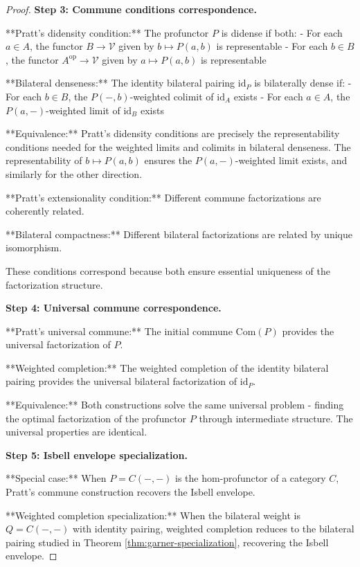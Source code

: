 \documentclass[11pt]{article}
\theoremstyle{plain}
\theoremstyle{definition}
\theoremstyle{remark}
\newcommand{\V}{\mathcal{V}}
\newcommand{\op}{\mathrm{op}}
\begin{document}
\begin{proof}
\textbf{Step 3: Commune conditions correspondence.}

**Pratt's didensity condition:** The profunctor $P$ is didense if both:
- For each $a \in A$, the functor $B \to \V$ given by $b \mapsto P(a, b)$ is representable
- For each $b \in B$, the functor $A^{\op} \to \V$ given by $a \mapsto P(a, b)$ is representable

**Bilateral denseness:** The identity bilateral pairing $\text{id}_P$ is bilaterally dense if:
- For each $b \in B$, the $P(-, b)$-weighted colimit of $\text{id}_A$ exists
- For each $a \in A$, the $P(a, -)$-weighted limit of $\text{id}_B$ exists

**Equivalence:** Pratt's didensity conditions are precisely the representability conditions needed for the weighted limits and colimits in bilateral denseness. The representability of $b \mapsto P(a, b)$ ensures the $P(a, -)$-weighted limit exists, and similarly for the other direction.

**Pratt's extensionality condition:** Different commune factorizations are coherently related.

**Bilateral compactness:** Different bilateral factorizations are related by unique isomorphism.

These conditions correspond because both ensure essential uniqueness of the factorization structure.

\textbf{Step 4: Universal commune correspondence.}

**Pratt's universal commune:** The initial commune $\text{Com}(P)$ provides the universal factorization of $P$.

**Weighted completion:** The weighted completion of the identity bilateral pairing provides the universal bilateral factorization of $\text{id}_P$.

**Equivalence:** Both constructions solve the same universal problem - finding the optimal factorization of the profunctor $P$ through intermediate structure. The universal properties are identical.

\textbf{Step 5: Isbell envelope specialization.}

**Special case:** When $P = C(-, -)$ is the hom-profunctor of a category $C$, Pratt's commune construction recovers the Isbell envelope.

**Weighted completion specialization:** When the bilateral weight is $Q = C(-, -)$ with identity pairing, weighted completion reduces to the bilateral pairing studied in Theorem \ref{thm:garner-specialization}, recovering the Isbell envelope.


\end{proof}
\end{document}
